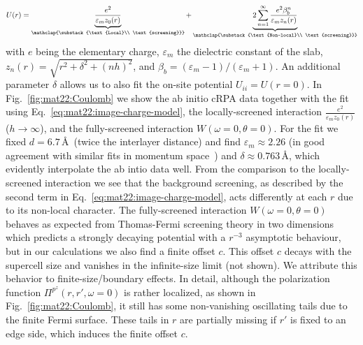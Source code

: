 \begin{equation} \label{eq:mat22:image-charge-model}
    U(r) =
        \underbrace{
            \frac{e^2}{\varepsilon_m z_0(r)}
        }_{\mathclap{\substack{\text{Local}\\ \text{screening}}}}
        + \underbrace{
            2 \sum_{n=1}^\infty \frac{e^2 \beta_b^n}{\varepsilon_m z_n(r)}
        }_{\mathclap{\substack{\text{Non-local}\\ \text{screening}}}}
\end{equation}
with $e$ being the elementary charge, $\varepsilon_m$ the dielectric constant of the slab, $z_n(r) = \sqrt{r^2 + \delta^2 + (nh)^2}$, and $\beta_b = (\varepsilon_m - 1) / (\varepsilon_m + 1)$. An additional parameter $\delta$ allows us to also fit the on-site potential $U_{ii} = U(r=0)$. In Fig.~\ref{fig:mat22:Coulomb} we show the ab initio cRPA data together with the fit using Eq.~\eqref{eq:mat22:image-charge-model}, the locally-screened interaction $\frac{e^2}{\varepsilon_m z_0(r)}$ ($h \rightarrow \infty$), and the fully-screened interaction $W(\omega=0,\theta=0)$. For the fit we fixed $d = 6.7\,$\AA\ (twice the interlayer distance) and find $\varepsilon_m \approx 2.26$ (in good agreement with similar fits in momentum space~\cite{rosner_wannier_2015}) and $\delta \approx 0.763\,$\AA, which evidently interpolate the ab intio data well. From the comparison to the locally-screened interaction we see that the background screening, as described by the second term in Eq.~\eqref{eq:mat22:image-charge-model}, acts differently at each $r$ due to its non-local character. The fully-screened interaction $W(\omega=0,\theta=0)$ behaves as expected from Thomas-Fermi screening theory in two dimensions~\cite{katsnelson_nonlinear_2006} which predicts a strongly decaying potential with a $r^{-3}$ asymptotic behaviour, but in our calculations we also find a finite offset $c$. This offset $c$ decays with the supercell size and vanishes in the infinite-size limit (not shown). We attribute this behavior to finite-size/boundary effects. In detail, although the polarization function $\Pi^{p^z}(r, r', \omega=0)$ is rather localized, as shown in Fig.~\ref{fig:mat22:Coulomb}, it still has some non-vanishing oscillating tails due to the finite Fermi surface. These tails in $r$ are partially missing if $r'$ is fixed to an edge side, which induces the finite offset $c$. 

 
